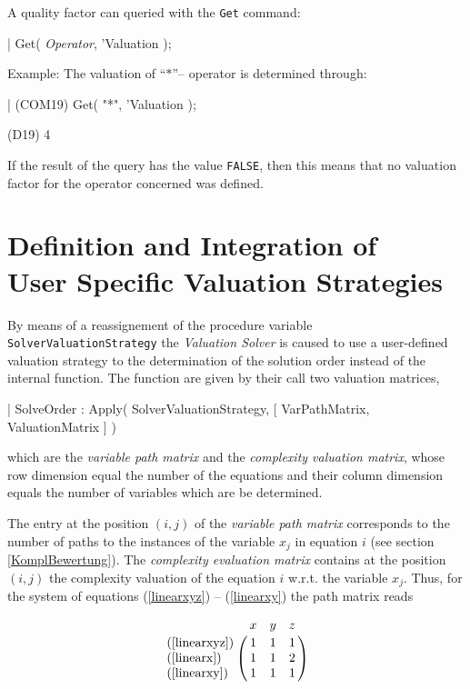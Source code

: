 A quality factor can queried with the \verb+Get+ command:
\begin{literatim}{|}
     Get( {\em{}Operator}, 'Valuation );
\end{literatim}
Example: The valuation of ``$*$''-- operator is determined through:

\begin{literatim}{|}
(COM19) Get( "{}*"{}, 'Valuation );

(D19)                                   4
\end{literatim}

If the result of the query has  the value \verb+FALSE+,  then this means that no valuation factor for the operator concerned was defined.




\section[User Specific Valuation Strategie]%
{Definition and Integration of \\User Specific Valuation Strategies%
\label{SolverValuationStrategies}}

By means of a reassignement of the procedure variable \verb+SolverValuationStrategy+ the {\em Valuation Solver} is caused to use  a user-defined valuation strategy to the determination of the solution order instead of the internal function. The function are given by their call 
two valuation matrices,
\begin{literatim}{|}
     SolveOrder : Apply(
       SolverValuationStrategy, [ VarPathMatrix, ValuationMatrix ]
     )
\end{literatim}
which are the  {\em variable path matrix} and the {\em complexity valuation matrix}, whose row dimension equal the number of the equations and their column dimension equals the number of variables which are be determined.

The entry at the position $(i,j)$ of the {\em variable path matrix} corresponds to the number of paths to the instances of the variable $x_j$ in equation  $i$ (see section \ref{KomplBewertung}). The {\em complexity evaluation matrix} contains at the position $(i,j)$ the complexity valuation of the equation $i$
w.r.t. the variable $x_j$. Thus, for the system of equations (\ref{linearxyz}) -- (\ref{linearxy})
the path matrix reads 

$$
\bordermatrix{
                  & x & y & z \cr
(\ref{linearxyz}) & 1 & 1 & 1 \cr 
(\ref{linearx})  & 1 & 1 & 2 \cr 
(\ref{linearxy}) & 1 & 1 & 1 \cr 
}
$$

